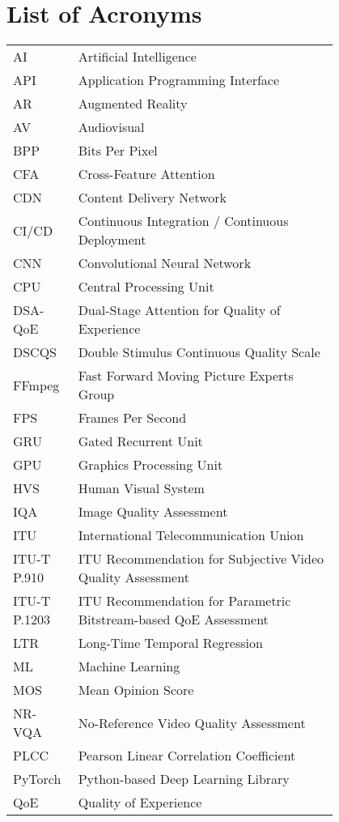 \chapter*{List of Acronyms}

\begin{flushleft}
\begin{tabular}{l p{0.8\linewidth}}
AI & Artificial Intelligence \\
API & Application Programming Interface \\
AR & Augmented Reality \\
AV & Audiovisual \\
BPP & Bits Per Pixel \\
CFA & Cross-Feature Attention \\
CDN & Content Delivery Network \\
CI/CD & Continuous Integration / Continuous Deployment \\
CNN & Convolutional Neural Network \\
CPU & Central Processing Unit \\
DSA-QoE & Dual-Stage Attention for Quality of Experience \\
DSCQS & Double Stimulus Continuous Quality Scale \\
FFmpeg & Fast Forward Moving Picture Experts Group \\
FPS & Frames Per Second \\
GRU & Gated Recurrent Unit \\
GPU & Graphics Processing Unit \\
HVS & Human Visual System \\
IQA & Image Quality Assessment \\
ITU & International Telecommunication Union \\
ITU-T P.910 & ITU Recommendation for Subjective Video Quality Assessment \\
ITU-T P.1203 & ITU Recommendation for Parametric Bitstream-based QoE Assessment \\
LTR & Long-Time Temporal Regression \\
ML & Machine Learning \\
MOS & Mean Opinion Score \\
NR-VQA & No-Reference Video Quality Assessment \\
PLCC & Pearson Linear Correlation Coefficient \\
PyTorch & Python-based Deep Learning Library \\
QoE & Quality of Experience \\

\end{tabular}
\end{flushleft}

